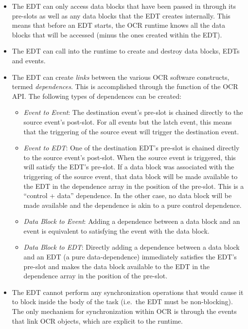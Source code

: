 \begin{itemize}
\item The EDT can only access data blocks that have been passed in
through its pre-slots as well as any data blocks that the EDT creates
internally. This means that before an EDT starts, the OCR runtime
knows all the data blocks that will be accessed (minus the ones
created within the EDT).

\item The EDT can call into the runtime to create and destroy data
blocks, EDTs and events.

\item The EDT can create \emph{links} between the various OCR
software constructs, termed \emph{dependences}. This is
accomplished through the  function of the OCR
API. The following types of dependences can be created:
\begin{itemize}
\item \emph{Event to Event}: The destination event’s pre-slot is chained
directly to the source event’s post-slot.
For all events but the latch event, this means that the triggering of
the source event will trigger the destination event.

\item \emph{Event to EDT}: One of the destination EDT’s pre-slot is chained
directly to the source event’s post-slot. When the source event is
triggered, this will satisfy the EDT’s pre-slot. If a data block was
associated with the triggering of the source event, that data block
will be made available to the EDT in the dependence array in the
position of the pre-slot. This is a “control + data” dependence. In
the other case, no data block will be made available and the
dependence is akin to a pure control dependence.

\item \emph{Data Block to Event}: Adding a dependence between a data block and an
event is equivalent to satisfying the event with the data block.

\item \emph{Data Block to EDT}: Directly adding a dependence between a data block and
an EDT (a pure data-dependence) immediately satisfies the EDT’s
pre-slot and makes the data block available to the EDT in the
dependence array in the position of the pre-slot.
\end{itemize}

\item The EDT cannot perform any synchronization operations that would
cause it to block inside the body of the task (i.e.\ the EDT must be
non-blocking). The only mechanism for synchronization within OCR is
through the events that link OCR objects, which are explicit to the
runtime.
\end{itemize}

